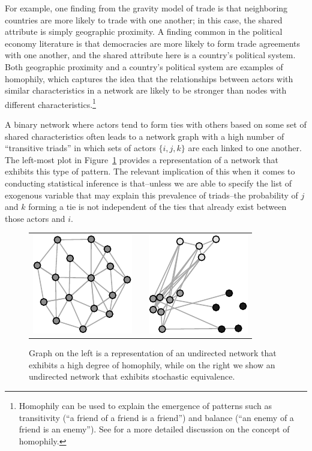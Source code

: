 \documentclass[11pt,pdflatex]{elsarticle}
\begin{document}
For example, one finding from the gravity model of trade is that neighboring countries are more likely to trade with one another; in this case, the shared attribute is simply geographic proximity. A finding common in the political economy literature is that democracies are more likely to form trade agreements with one another, and the shared attribute here is a country's political system. Both geographic proximity and a country's political system are examples of homophily, which captures the idea that the relationships between actors with similar characteristics in a network are likely to be stronger than nodes with different characteristics.\footnote{Homophily can be used to explain the emergence of patterns such as transitivity (``a friend of a friend is a friend'') and balance (``an enemy of a friend is an enemy''). See \citet{shalizi:thomas:2011} for a more detailed discussion on the concept of homophily.} 

A binary network where actors tend to form ties with others based on some set of shared characteristics often leads to a network graph with a high number of ``transitive triads'' in which  sets of actors $\{i,j,k\}$ are each linked to one another. The left-most plot in Figure~\ref{fig:homphStochEquivNet} provides a representation of a network that exhibits this type of pattern. The relevant implication of this when it comes to conducting statistical inference is that--unless we are able to specify the list of exogenous variable that may explain this prevalence of triads--the probability of $j$ and $k$ forming a tie is not independent of the ties that already exist between those actors and $i$. 

\begin{figure}[ht]
	\centering
	\begin{tabular}{lcr}
	\includegraphics[width=.33\textwidth]{homophNet} & \hspace{2cm} &
	\includegraphics[width=.33\textwidth]{stochEquivNet}	
	\end{tabular}
	\caption{Graph on the left is a representation of an undirected network that exhibits a high degree of homophily, while on the right we show an undirected network that exhibits stochastic equivalence. }
	\label{fig:homphStochEquivNet}
\end{figure}
\end{document}
